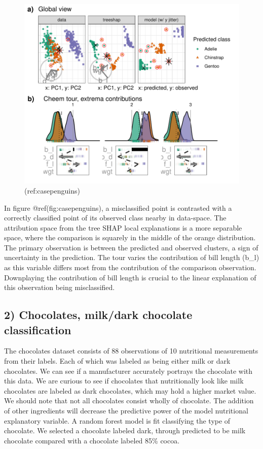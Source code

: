 \documentclass[
]{article}
\begin{document}
\begin{figure}

{\centering \includegraphics[width=1\linewidth]{./figures/case_penguins} 

}

\caption{(ref:casepenguins)}\label{fig:casepenguins}
\end{figure}

In figure @ref(fig:casepenguins), a misclassified point is contrasted
with a correctly classified point of its observed class nearby in
data-space. The attribution space from the tree SHAP local explanations
is a more separable space, where the comparison is squarely in the
middle of the orange distribution. The primary observation is between
the predicted and observed clusters, a sign of uncertainty in the
prediction. The tour varies the contribution of bill length (b\_l) as
this variable differs most from the contribution of the comparison
observation. Downplaying the contribution of bill length is crucial to
the linear explanation of this observation being misclassified.

\hypertarget{chocolates-milkdark-chocolate-classification}{%
\subsection{2) Chocolates, milk/dark chocolate
classification}\label{chocolates-milkdark-chocolate-classification}}

The chocolates dataset consists of 88 observations of 10 nutritional
measurements from their labels. Each of which was labeled as being
either milk or dark chocolates. We can see if a manufacturer accurately
portrays the chocolate with this data. We are curious to see if
chocolates that nutritionally look like milk chocolates are labeled as
dark chocolates, which may hold a higher market value. We should note
that not all chocolates consist wholly of chocolate. The addition of
other ingredients will decrease the predictive power of the model
nutritional explanatory variable. A random forest model is fit
classifying the type of chocolate. We selected a chocolate labeled dark,
through predicted to be milk chocolate compared with a chocolate labeled
85\% cocoa.
\end{document}
